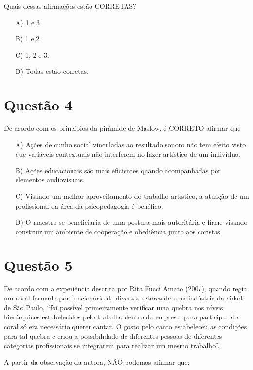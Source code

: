 \documentclass[a4paper, 12pt, openright, oneside, english, brazil, article]{abntex2}
\begin{document}
	Quais dessas afirmações estão CORRETAS?
	
	\begin{enumerate}
		\item [A)] 1 e 3
		\item [B)] 1 e 2
		\item [C)] 1, 2 e 3.
		\item [D)] Todas estão corretas.
	\end{enumerate}
	
	\section{Questão 4}
	
	De acordo com os princípios da pirâmide de Maslow, é CORRETO afirmar que
	
	\begin{enumerate}
		\item [A)] Ações de cunho social vinculadas ao resultado sonoro não tem efeito visto que variáveis contextuais não interferem no fazer artístico de um indivíduo.
		\item [B)] Ações educacionais são mais eficientes quando acompanhadas por elementos audiovisuais.
		\item [C)] Visando um melhor aproveitamento do trabalho artístico, a atuação de um profissional da área da psicopedagogia é benéfico.
		\item [D)] O maestro se beneficiaria de uma postura mais autoritária e firme visando construir um ambiente de cooperação e obediência junto aos coristas.
	\end{enumerate}

	\section{Questão 5}
	De acordo com a experiência descrita por Rita Fucci Amato (2007), quando regia um coral formado por funcionário de diversos setores de uma indústria da cidade de São Paulo, ``foi possível primeiramente verificar uma quebra nos níveis hierárquicos estabelecidos	pelo trabalho dentro da empresa; para participar do coral só era necessário querer cantar. O gosto pelo canto estabeleceu as condições para tal quebra e criou a possibilidade de diferentes pessoas de diferentes categorias profissionais se integrarem para realizar um mesmo trabalho''.
	
	A partir da observação da autora, NÃO podemos afirmar que:
	
\end{document}
